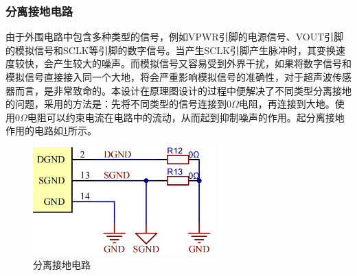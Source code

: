 \subsubsection{分离接地电路}
由于外围电路中包含多种类型的信号，例如VPWR引脚的电源信号、VOUT引脚的模拟信号和SCLK等引脚的数字信号。当产生SCLK引脚产生脉冲时，其变换速度较快，会产生较大的噪声。而模拟信号又容易受到外界干扰，如果将数字信号和模拟信号直接接入同一个大地，将会严重影响模拟信号的准确性，对于超声波传感器而言，是非常致命的。本设计在原理图设计的过程中便解决了不同类型分离接地的问题，采用的方法是：先将不同类型的信号连接到0$\Omega$电阻，再连接到大地。使用0$\Omega$电阻可以约束电流在电路中的流动，从而起到抑制噪声的作用。起分离接地作用的电路如\ref{分离接地电路}所示。
\begin{figure}[!h]
	\centering
	\includegraphics[width=7cm]{figure/seperate ground.png}
	\caption{分离接地电路}
	\label{分离接地电路}
\end{figure}
